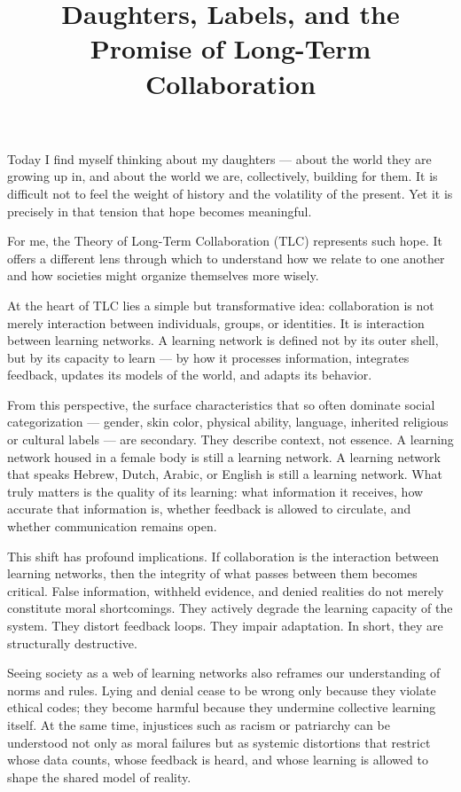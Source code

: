 \documentclass[11pt]{article}
\title{Daughters, Labels, and the Promise of Long-Term Collaboration}
\author{}
\date{}
\begin{document}
\maketitle

Today I find myself thinking about my daughters --- about the world they are growing up in, and about the world we are, collectively, building for them. It is difficult not to feel the weight of history and the volatility of the present. Yet it is precisely in that tension that hope becomes meaningful.

For me, the Theory of Long-Term Collaboration (TLC) represents such hope. It offers a different lens through which to understand how we relate to one another and how societies might organize themselves more wisely.

At the heart of TLC lies a simple but transformative idea: collaboration is not merely interaction between individuals, groups, or identities. It is interaction between learning networks. A learning network is defined not by its outer shell, but by its capacity to learn --- by how it processes information, integrates feedback, updates its models of the world, and adapts its behavior.

From this perspective, the surface characteristics that so often dominate social categorization --- gender, skin color, physical ability, language, inherited religious or cultural labels --- are secondary. They describe context, not essence. A learning network housed in a female body is still a learning network. A learning network that speaks Hebrew, Dutch, Arabic, or English is still a learning network. What truly matters is the quality of its learning: what information it receives, how accurate that information is, whether feedback is allowed to circulate, and whether communication remains open.

This shift has profound implications. If collaboration is the interaction between learning networks, then the integrity of what passes between them becomes critical. False information, withheld evidence, and denied realities do not merely constitute moral shortcomings. They actively degrade the learning capacity of the system. They distort feedback loops. They impair adaptation. In short, they are structurally destructive.

Seeing society as a web of learning networks also reframes our understanding of norms and rules. Lying and denial cease to be wrong only because they violate ethical codes; they become harmful because they undermine collective learning itself. At the same time, injustices such as racism or patriarchy can be understood not only as moral failures but as systemic distortions that restrict whose data counts, whose feedback is heard, and whose learning is allowed to shape the shared model of reality.
\end{document}
